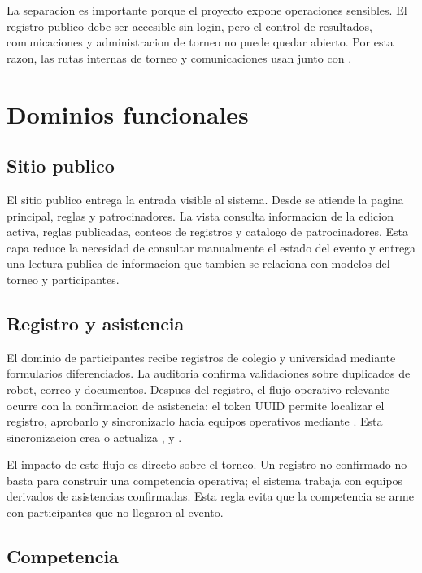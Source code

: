La separacion es importante porque el proyecto expone operaciones sensibles. El registro publico debe ser accesible sin login, pero el control de resultados, comunicaciones y administracion de torneo no puede quedar abierto. Por esta razon, las rutas internas de torneo y comunicaciones usan  junto con .

\section{Dominios funcionales}
\label{sec:descripcion-dominios}

\subsection{Sitio publico}

El sitio publico entrega la entrada visible al sistema. Desde  se atiende la pagina principal, reglas y patrocinadores. La vista  consulta informacion de la edicion activa, reglas publicadas, conteos de registros y catalogo de patrocinadores. Esta capa reduce la necesidad de consultar manualmente el estado del evento y entrega una lectura publica de informacion que tambien se relaciona con modelos del torneo y participantes.

\subsection{Registro y asistencia}

El dominio de participantes recibe registros de colegio y universidad mediante formularios diferenciados. La auditoria confirma validaciones sobre duplicados de robot, correo y documentos. Despues del registro, el flujo operativo relevante ocurre con la confirmacion de asistencia: el token UUID permite localizar el registro, aprobarlo y sincronizarlo hacia equipos operativos mediante . Esta sincronizacion crea o actualiza ,  y .

El impacto de este flujo es directo sobre el torneo. Un registro no confirmado no basta para construir una competencia operativa; el sistema trabaja con equipos derivados de asistencias confirmadas. Esta regla evita que la competencia se arme con participantes que no llegaron al evento.

\subsection{Competencia}

